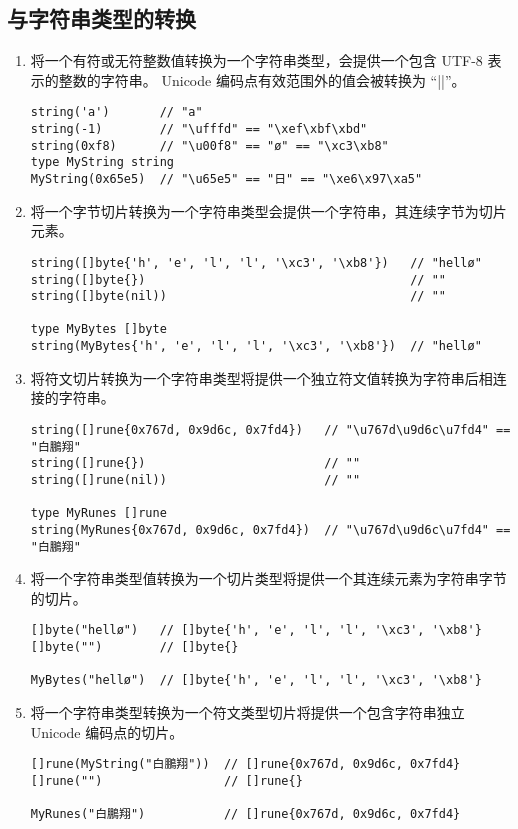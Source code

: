 \subsection{与字符串类型的转换}
\begin{enumerate}
\item 
将一个有符或无符整数值转换为一个字符串类型，会提供一个包含 UTF-8 表示的整数的字符串。
Unicode 编码点有效范围外的值会被转换为 ``\code|\uFFFD|''。
\begin{lstlisting}[style=golang, numbers=none]
string('a')       // "a"
string(-1)        // "\ufffd" == "\xef\xbf\xbd"
string(0xf8)      // "\u00f8" == "ø" == "\xc3\xb8"
type MyString string
MyString(0x65e5)  // "\u65e5" == "日" == "\xe6\x97\xa5"
\end{lstlisting}
\item 
将一个字节切片转换为一个字符串类型会提供一个字符串，其连续字节为切片元素。
\begin{lstlisting}[style=golang, numbers=none]
string([]byte{'h', 'e', 'l', 'l', '\xc3', '\xb8'})   // "hellø"
string([]byte{})                                     // ""
string([]byte(nil))                                  // ""

type MyBytes []byte
string(MyBytes{'h', 'e', 'l', 'l', '\xc3', '\xb8'})  // "hellø"
\end{lstlisting}

\item
将符文切片转换为一个字符串类型将提供一个独立符文值转换为字符串后相连接的字符串。
\begin{lstlisting}[style=golang, numbers=none]
string([]rune{0x767d, 0x9d6c, 0x7fd4})   // "\u767d\u9d6c\u7fd4" == "白鵬翔"
string([]rune{})                         // ""
string([]rune(nil))                      // ""

type MyRunes []rune
string(MyRunes{0x767d, 0x9d6c, 0x7fd4})  // "\u767d\u9d6c\u7fd4" == "白鵬翔"
\end{lstlisting}

\item
将一个字符串类型值转换为一个切片类型将提供一个其连续元素为字符串字节的切片。
\begin{lstlisting}[style=golang, numbers=none]
[]byte("hellø")   // []byte{'h', 'e', 'l', 'l', '\xc3', '\xb8'}
[]byte("")        // []byte{}

MyBytes("hellø")  // []byte{'h', 'e', 'l', 'l', '\xc3', '\xb8'}
\end{lstlisting}

\item
将一个字符串类型转换为一个符文类型切片将提供一个包含字符串独立 Unicode 编码点的切片。
\begin{lstlisting}[style=golang, numbers=none]
[]rune(MyString("白鵬翔"))  // []rune{0x767d, 0x9d6c, 0x7fd4}
[]rune("")                 // []rune{}

MyRunes("白鵬翔")           // []rune{0x767d, 0x9d6c, 0x7fd4}
\end{lstlisting}
\end{enumerate}

